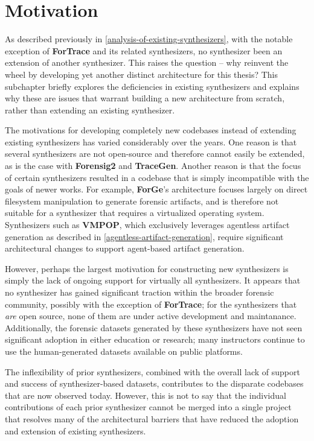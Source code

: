 \section{Motivation}\label{motivation}

As described previously in \ref{analysis-of-existing-synthesizers}, with the notable exception of
\textbf{ForTrace} and its related synthesizers, no synthesizer been an
extension of another synthesizer. This raises the question -- why
reinvent the wheel by developing yet another distinct architecture for
this thesis? This subchapter briefly explores the deficiencies in
existing synthesizers and explains why these are issues that warrant
building a new architecture from scratch, rather than extending an
existing synthesizer.

The motivations for developing completely new codebases instead of
extending existing synthesizers has varied considerably over the years.
One reason is that several synthesizers are not open-source and
therefore cannot easily be extended, as is the case with
\textbf{Forensig2} and \textbf{TraceGen}. Another reason is that the
focus of certain synthesizers resulted in a codebase that is simply
incompatible with the goals of newer works. For example,
\textbf{ForGe}'s architecture focuses largely on direct filesystem
manipulation to generate forensic artifacts, and is therefore not
suitable for a synthesizer that requires a virtualized operating system.
Synthesizers such as \textbf{VMPOP}, which exclusively leverages
agentless artifact generation as described in \ref{agentless-artifact-generation}, require significant
architectural changes to support agent-based artifact generation.

However, perhaps the largest motivation for constructing new
synthesizers is simply the lack of ongoing support for virtually all
synthesizers. It appears that no synthesizer has gained significant
traction within the broader forensic community, possibly with the
exception of \textbf{ForTrace}; for the synthesizers that \emph{are}
open source, none of them are under active development and maintanance.
Additionally, the forensic datasets generated by these synthesizers have
not seen significant adoption in either education or research; many
instructors continue to use the human-generated datasets available on
public platforms.

The inflexibility of prior synthesizers, combined with the overall lack
of support and success of synthesizer-based datasets, contributes to the
disparate codebases that are now observed today. However, this is not to
say that the individual contributions of each prior synthesizer cannot
be merged into a single project that resolves many of the architectural
barriers that have reduced the adoption and extension of existing
synthesizers.

